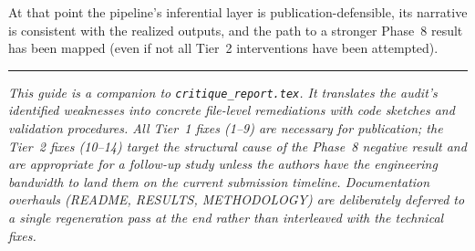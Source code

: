 \documentclass[11pt]{article}
\newcommand{\code}[1]{\texttt{#1}}
\begin{document}
\noindent At that point the pipeline's inferential layer is publication-defensible, its narrative is consistent with the realized outputs, and the path to a stronger Phase~8 result has been mapped (even if not all Tier~2 interventions have been attempted).

\vspace{1.5em}
\begin{center}
\rule{0.4\textwidth}{0.4pt}
\end{center}
\vspace{0.5em}

\noindent\textit{This guide is a companion to \code{critique\_report.tex}. It translates the audit's identified weaknesses into concrete file-level remediations with code sketches and validation procedures. All Tier~1 fixes (1--9) are necessary for publication; the Tier~2 fixes (10--14) target the structural cause of the Phase~8 negative result and are appropriate for a follow-up study unless the authors have the engineering bandwidth to land them on the current submission timeline. Documentation overhauls (README, RESULTS, METHODOLOGY) are deliberately deferred to a single regeneration pass at the end rather than interleaved with the technical fixes.}
\end{document}
